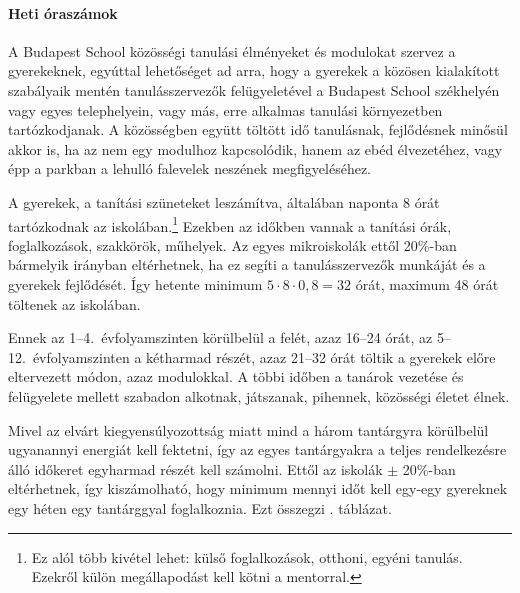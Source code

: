 \paragraph{Heti óraszámok}

A Budapest School közösségi tanulási élményeket és modulokat szervez a
gyerekeknek, egyúttal lehetőséget ad arra, hogy a gyerekek a közösen kialakított
szabályaik mentén tanulásszervezők felügyeletével a Budapest School székhelyén
vagy egyes telephelyein, vagy más, erre alkalmas tanulási környezetben
tartózkodjanak. A közösségben együtt töltött idő tanulásnak, fejlődésnek
minősül akkor is, ha az nem egy modulhoz kapcsolódik, hanem az ebéd
élvezetéhez, vagy épp a parkban a lehulló falevelek neszének megfigyeléséhez.

A gyerekek, a tanítási szüneteket leszámítva, általában naponta 8 órát
tartózkodnak az
iskolában.\footnote{Ez alól több kivétel lehet: külső foglalkozások, otthoni,
  egyéni tanulás. Ezekről külön megállapodást kell kötni a mentorral.} Ezekben
az
időkben vannak a tanítási órák, foglalkozások, szakkörök,
műhelyek. Az egyes mikroiskolák ettől 20\%-ban bármelyik irányban eltérhetnek,
ha ez segíti a tanulásszervezők munkáját és a gyerekek fejlődését. Így hetente
minimum $5 \cdot 8 \cdot 0,8 = 32$ órát, maximum 48 órát töltenek az iskolában.

Ennek az 1--4.~évfolyamszinten körülbelül a felét, azaz 16--24 órát, az 5--12.~évfolyamszinten a  kétharmad részét, azaz 21--32 órát
töltik a gyerekek előre eltervezett módon, azaz modulokkal. A többi időben a tanárok
vezetése és felügyelete mellett szabadon alkotnak, játszanak, pihennek,
közösségi életet élnek.

Mivel az elvárt kiegyensúlyozottság miatt mind a három tantárgyra körülbelül
ugyanannyi energiát kell fektetni, így az egyes tantárgyakra a teljes
rendelkezésre álló időkeret egyharmad részét kell számolni. Ettől az iskolák
$\pm$ 20\%-ban eltérhetnek, így kiszámolható, hogy minimum mennyi időt kell
egy-egy gyereknek egy héten egy tantárggyal foglalkoznia. Ezt összegzi
. táblázat.

